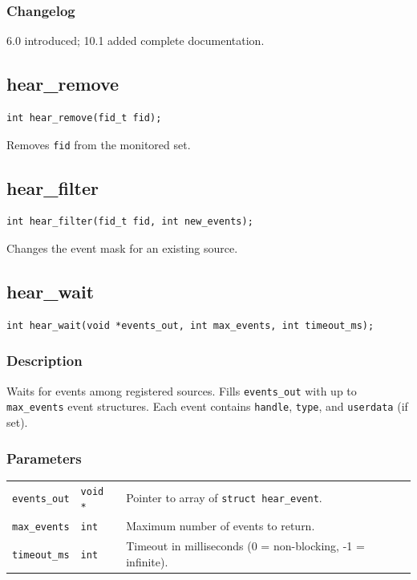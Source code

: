 \documentclass[12pt,a4paper]{article}
\begin{document}
\subsubsection{Changelog}
6.0 introduced; 10.1 added complete documentation.

\subsection{hear\_remove}
\begin{lstlisting}
int hear_remove(fid_t fid);
\end{lstlisting}
Removes \texttt{fid} from the monitored set.

\subsection{hear\_filter}
\begin{lstlisting}
int hear_filter(fid_t fid, int new_events);
\end{lstlisting}
Changes the event mask for an existing source.

\subsection{hear\_wait}
\begin{lstlisting}
int hear_wait(void *events_out, int max_events, int timeout_ms);
\end{lstlisting}

\subsubsection{Description}
Waits for events among registered sources. Fills \texttt{events\_out} with up to \texttt{max\_events} event structures. Each event contains \texttt{handle}, \texttt{type}, and \texttt{userdata} (if set).

\subsubsection{Parameters}
\begin{tabularx}{\textwidth}{|l|l|X|}
\hline
\verb|events_out| & \verb|void *| & Pointer to array of \texttt{struct hear\_event}. \\
\verb|max_events| & \verb|int| & Maximum number of events to return. \\
\verb|timeout_ms| & \verb|int| & Timeout in milliseconds (0 = non-blocking, -1 = infinite). \\
\hline
\end{tabularx}
\end{document}
